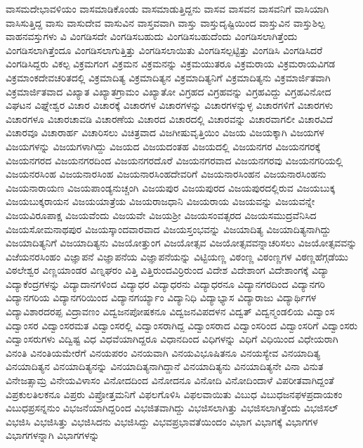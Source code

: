 {ವಾಸಮದೇಭಾವಳಿಯಂ
ವಾಸಮಾಡಿಕೊಂಡು
ವಾಸಮಾಡುತ್ತಿದ್ದನು
ವಾಸವ
ವಾಸವನ
ವಾಸವನಿಗೆ
ವಾಸಿಯಾಗಿ
ವಾಸಿಸುತ್ತಿದ್ದ
ವಾಸು
ವಾಸುದೇವ
ವಾಸುವಿನ
ವಾಸ್ತವವಾಗಿ
ವಾಸ್ತು
ವಾಸ್ತುದೃಷ್ಟಿಯಿಂದ
ವಾಸ್ತುವಿನ
ವಾಸ್ತುಶಿಲ್ಪ
ವಾಹನವಸ್ತುಗಳು
ವಿ
ವಿಂಗಡಿಸದೇ
ವಿಂಗಡಿಸಬಹುದು
ವಿಂಗಡಿಸಬಹುದೆಂದು
ವಿಂಗಡಿಸಲಾಗಿತ್ತೆಂದು
ವಿಂಗಡಿಸಲಾಗಿತ್ತೆಂದೂ
ವಿಂಗಡಿಸಲಾಗುತ್ತಿತ್ತು
ವಿಂಗಡಿಸಲಾಯಿತು
ವಿಂಗಡಿಸಲ್ಪಟ್ಟಿತ್ತು
ವಿಂಗಡಿಸಿ
ವಿಂಗಡಿಸಿದರೆ
ವಿಂಗಡಿಸಿದ್ದರು
ವಿಕಲ್ಪ
ವಿಕ್ರಮಗಂಗ
ವಿಕ್ರಮನ
ವಿಕ್ರಮನನ್ನು
ವಿಕ್ರಮಯುತರೂ
ವಿಕ್ರಮರಾಯ
ವಿಕ್ರಮರಾಯವಿಗಡ
ವಿಕ್ರಮಾಂಕದೇವಚರಿತದಲ್ಲಿ
ವಿಕ್ರಮಾದಿತ್ಯ
ವಿಕ್ರಮಾದಿತ್ಯನ
ವಿಕ್ರಮಾದಿತ್ಯನಿಗೆ
ವಿಕ್ರಮಾದಿತ್ಯನು
ವಿಕ್ರಮಾರ್ಜಿತವಾಗಿ
ವಿಕ್ರಮಾರ್ಜಿತವಾದ
ವಿಖ್ಯಾತ
ವಿಖ್ಯಾತಗ್ರಾಮಂ
ವಿಖ್ಯಾತೋ
ವಿಗ್ರಹದ
ವಿಗ್ರಹವನ್ನು
ವಿಗ್ರಹವಿದ್ದು
ವಿಗ್ರಹವಿನೋದ
ವಿಘಟನ
ವಿಘ್ನೇಶ್ವರ
ವಿಚಾರ
ವಿಚಾರಕ್ಕೆ
ವಿಚಾರಗಳ
ವಿಚಾರಗಳನ್ನು
ವಿಚಾರಗಳನ್ನುಳ್ಳ
ವಿಚಾರಗಳಿಗೆ
ವಿಚಾರಗಳು
ವಿಚಾರಗಳೂ
ವಿಚಾರಚಾವಡಿ
ವಿಚಾರಣೆಯ
ವಿಚಾರದ
ವಿಚಾರದಲ್ಲಿ
ವಿಚಾರವನ್ನು
ವಿಚಾರವಾಗಲೀ
ವಿಚಾರವಿದೆ
ವಿಚಾರವೂ
ವಿಚಾರಾರ್ಹ
ವಿಚಾರಿಸಲು
ವಿಚಿತ್ರವಾದ
ವಿಜಗೀಷುವೃತ್ತಿಯಿಂ
ವಿಜಯ
ವಿಜಯಕ್ಕಾಗಿ
ವಿಜಯಗಳ
ವಿಜಯಗಳನ್ನು
ವಿಜಯಗಳಾಗಿದ್ದು
ವಿಜಯದ
ವಿಜಯದಂತಹ
ವಿಜಯದಲ್ಲಿ
ವಿಜಯನಗರ
ವಿಜಯನಗರಕ್ಕೆ
ವಿಜಯನಗರದ
ವಿಜಯನಗರದಿಂದ
ವಿಜಯನಗರದೊರೆ
ವಿಜಯನಗರವಾದ
ವಿಜಯನಗರವು
ವಿಜಯನಗರಿಯಲ್ಲಿ
ವಿಜಯನರಸಿಂಹ
ವಿಜಯನಾರಸಿಂಹ
ವಿಜಯನಾರಸಿಂಹದೇವರಿಗೆ
ವಿಜಯನಾರಸಿಂಹನ
ವಿಜಯನಾರಸಿಂಹನು
ವಿಜಯನಾರಾಯಣ
ವಿಜಯಪಾಂಡ್ಯನುಚ್ಚಂಗಿ
ವಿಜಯಪುರ
ವಿಜಯಪುರದ
ವಿಜಯಪುರದಲ್ಲಿರುವ
ವಿಜಯಬುಕ್ಕ
ವಿಜಯಬುಕ್ಕರಾಯನ
ವಿಜಯಯಾತ್ರೆಯ
ವಿಜಯರಾಜಧಾನಿ
ವಿಜಯರಾಯ
ವಿಜಯವನ್ನು
ವಿಜಯವನ್ನೇ
ವಿಜಯವಿರೂಪಾಕ್ಷ
ವಿಜಯವೆಂದು
ವಿಜಯವೇ
ವಿಜಯಶ್ರೀ
ವಿಜಯಸಂವತ್ಸರದ
ವಿಜಯಸಮುದ್ರವೆನಿಸಿದ
ವಿಜಯಸೋಮನಾಥಪುರ
ವಿಜಯಸ್ಕಾಂದವಾರವಾದ
ವಿಜಯಸ್ತಂಭವನ್ನು
ವಿಜಯಾದಿತ್ಯ
ವಿಜಯಾದಿತ್ಯನಾಗಿದ್ದು
ವಿಜಯಾದಿತ್ಯನಿಗೆ
ವಿಜಯಾದಿತ್ಯನು
ವಿಜಯೋತ್ತುಂಗ
ವಿಜಯೋತ್ಸವ
ವಿಜಯೋತ್ಸವವನ್ನಾಚರಿಸಲು
ವಿಜಯೋತ್ಸವವನ್ನು
ವಿಜೆಯನರಸಿಂಹಂ
ವಿಜ್ಞಾಪನೆ
ವಿಜ್ಞಾಪನೆಯ
ವಿಜ್ಞಾಪನೆಯನ್ನು
ವಿಟ್ಟಿಯಣ್ಣ
ವಿಠಂಣ್ಣ
ವಿಠಂಣ್ಣಗಳ
ವಿಠಣ್ಣಹೆಗ್ಗಡೆಯು
ವಿಠಲೇಶ್ವರ
ವಿಣ್ಣಯಾಂಡರ
ವಿಣ್ನಘರಂ
ವಿತ್ತಿ
ವಿತ್ತಿರುಂದವಿರ್ರಿರುಂದ
ವಿದೇಶ
ವಿದೇಶಾಂಗ
ವಿದೇಶಾಂಗಕ್ಕೆ
ವಿದ್ಯಾ
ವಿದ್ಯಾಕೆಂದ್ರಗಳನ್ನು
ವಿದ್ಯಾದಾನಗಳಿಂದ
ವಿದ್ಯಾಧರ
ವಿದ್ಯಾಧರನು
ವಿದ್ಯಾಧರನೂ
ವಿದ್ಯಾನಗರದಿಂದ
ವಿದ್ಯಾನಗರಿ
ವಿದ್ಯಾನಗರಿಯ
ವಿದ್ಯಾನಗರಿಯಿಂದ
ವಿದ್ಯಾನಗರ್ಯ್ಯಾಂ
ವಿದ್ಯಾನಿಧಿ
ವಿದ್ಯಾಭ್ಯಾಸ
ವಿದ್ಯಾರಾಜು
ವಿದ್ಯಾರ್ಥಿಗಳ
ವಿದ್ಯಾವಿಶಾರದರಪ್ಪ
ವಿದ್ರಾವಣಂ
ವಿದ್ವಜನಪೋಷಕನೂ
ವಿದ್ವಜನವಿಪದಳನ
ವಿದ್ವತ್
ವಿದ್ವನ್ಮಂಡಲಿಯ
ವಿದ್ವಾಂಸ
ವಿದ್ವಾಂಸರ
ವಿದ್ವಾಂಸರಮತ
ವಿದ್ವಾಂಸರಲ್ಲಿ
ವಿದ್ವಾಂಸರಾಗಿದ್ದ
ವಿದ್ವಾಂಸರಾದ
ವಿದ್ವಾಂಸರಿಂದ
ವಿದ್ವಾಂಸರಿಗೆ
ವಿದ್ವಾಂಸರು
ವಿದ್ವಾಂಸರುಗಳು
ವಿದ್ವಿಷ್ಟ
ವಿಧ
ವಿಧವೆಯಾಗಿದ್ದರೂ
ವಿಧಾನದಿಂದ
ವಿಧಿಗಳನ್ನು
ವಿಧಿಗೆ
ವಿಧಿಯಿಂದ
ವಿಧೇಯರಾಗಿ
ವಿನಂತಿ
ವಿನಂತಿಯಮೇರೆಗೆ
ವಿನಯಪರಂ
ವಿನಯವಾಗಿ
ವಿನಯವಿಭೂಷಿತನೂ
ವಿನಯಸ್ಯೇವ
ವಿನಯಾದಿತ್ಯ
ವಿನಯಾದಿತ್ಯನ
ವಿನಯಾದಿತ್ಯನನ್ನು
ವಿನಯಾದಿತ್ಯನಾಗಿದ್ದಾನೆ
ವಿನಯಾದಿತ್ಯನು
ವಿನಯಾದಿತ್ಯನೇ
ವಿನಾ
ವಿನುತ
ವಿನೇಜತ್ಸಾಮ್ರ
ವಿನೇಯವಿಳಾಸಂ
ವಿನೋದದಿಂದ
ವಿನೋದನೂ
ವಿನೋದಿ
ವಿನೋದಿಂದಾಳೆ
ವಿಪರೀತವಾಗಿದ್ದಂತೆ
ವಿಪ್ರಕುಲತಿಲಕನೂ
ವಿಪ್ರರು
ವಿಪ್ರೋತ್ತಮನಿಗೆ
ವಿಫಲಗೊಳಿಸಿ
ವಿಫಲವಾಯಿತು
ವಿಬುಧ
ವಿಬುಧಜನಫಳಪ್ರದಾಯಕಂ
ವಿಬುಧಪ್ರಸನ್ನನುಂ
ವಿಭಜನೆಯಾಗಿದ್ದರಿಂದ
ವಿಭಜಿತವಾಗಿದ್ದು
ವಿಭಜಿಸಲಾಗಿತ್ತು
ವಿಭಜಿಸಲಾಗಿತ್ತೆಂದು
ವಿಭಜಿಸಲ್
ವಿಭಜಿಸಿ
ವಿಭಜಿಸಿತ್ತು
ವಿಭಜಿಸಿದನು
ವಿಭಜಿಸಿದ್ದು
ವಿಭವಪ್ರಭಾವತೆಯಿಂದಂ
ವಿಭಾಗ
ವಿಭಾಗಕ್ಕೆ
ವಿಭಾಗಗಳ
ವಿಭಾಗಗಳನ್ನಾಗಿ
ವಿಭಾಗಗಳನ್ನು
}
